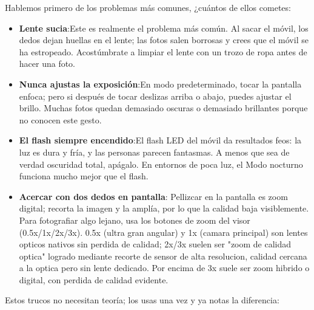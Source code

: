 


Hablemos primero de los problemas más comunes, ¿cuántos de ellos cometes:

\begin{itemize}
  \item \textbf{Lente sucia}:Este es realmente el problema más común. Al sacar el móvil, los dedos dejan huellas en el lente; las fotos salen borrosas y crees que el móvil se ha estropeado. Acostúmbrate a limpiar el lente con un trozo de ropa antes de hacer una foto.
  \item \textbf{Nunca ajustas la exposición}:En modo predeterminado, tocar la pantalla enfoca; pero si después de tocar deslizas arriba o abajo, puedes ajustar el brillo. Muchas fotos quedan demasiado oscuras o demasiado brillantes porque no conocen este gesto.
  \item \textbf{El flash siempre encendido}:El flash LED del móvil da resultados feos: la luz es dura y fría, y las personas parecen fantasmas. A menos que sea de verdad oscuridad total, apágalo. En entornos de poca luz, el Modo nocturno funciona mucho mejor que el flash.
  \item \textbf{Acercar con dos dedos en pantalla}: Pellizcar en la pantalla es zoom digital; recorta la imagen y la amplía, por lo que la calidad baja visiblemente. Para fotografiar algo lejano, usa los botones de zoom del visor (0.5x/1x/2x/3x). 0.5x (ultra gran angular) y 1x (camara principal) son lentes opticos nativos sin perdida de calidad; 2x/3x suelen ser "zoom de calidad optica" logrado mediante recorte de sensor de alta resolucion, calidad cercana a la optica pero sin lente dedicado. Por encima de 3x suele ser zoom hibrido o digital, con perdida de calidad evidente.
\end{itemize}


Estos trucos no necesitan teoría; los usas una vez y ya notas la diferencia:


